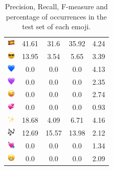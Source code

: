 \documentclass{article}
\begin{document}
\begin{table}
\begin{tabular}{|c|ccc|c|}
\includegraphics[height=0.37cm,width=0.37cm]{img/Spain.png} & 41.61 & 31.6 & 35.92 & 4.24\\ 
\includegraphics[height=0.37cm,width=0.37cm]{img/smiling_face_with_sunglasses.png} & 13.95 & 3.54 & 5.65 & 3.39\\ 
\includegraphics[height=0.37cm,width=0.37cm]{img/blue_heart.png} & 0.0 & 0.0 & 0.0 & 4.13\\ 
\includegraphics[height=0.37cm,width=0.37cm]{img/purple_heart.png} & 0.0 & 0.0 & 0.0 & 2.35\\ 
\includegraphics[height=0.37cm,width=0.37cm]{img/winking_face_with_tongue.png} & 0.0 & 0.0 & 0.0 & 2.74\\ 
\includegraphics[height=0.37cm,width=0.37cm]{img/revolving_hearts.png} & 0.0 & 0.0 & 0.0 & 0.93\\ 
\includegraphics[height=0.37cm,width=0.37cm]{img/sparkles.png} & 18.68 & 4.09 & 6.71 & 4.16\\ 
\includegraphics[height=0.37cm,width=0.37cm]{img/musical_notes.png} & 12.69 & 15.57 & 13.98 & 2.12\\ 
\includegraphics[height=0.37cm,width=0.37cm]{img/heart_with_arrow.png} & 0.0 & 0.0 & 0.0 & 1.34\\ 
\includegraphics[height=0.37cm,width=0.37cm]{img/beaming_face_with_smiling_eyes.png} & 0.0 & 0.0 & 0.0 & 2.09\\ 

\hline
\end{tabular}
\caption{\label{table:emoji_detailed} Precision, Recall, F-measure and percentage of occurrences in the test set of each emoji.}
\end{table}
\end{document}
